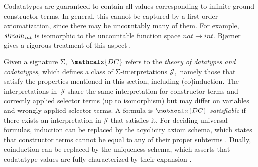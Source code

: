 \documentclass[smallcondensed,draft]{svjour3}
\newcommand\Sig{\mathrm{\Sigma}}
\newcommand\ty[1]{\textit{#1}}
\newcommand{\JJJJ}{\mathcal{\!J\!}}
\newcommand{\thD}{\mathcalx{DC}}
\newcommand\vthinspace{\kern+0.083333em}
\begin{document}
Codatatypes are guaranteed to contain all values corresponding to
infinite ground constructor terms.
In general, this cannot be captured by a
first-order axiomatization, since there may be uncountably many of them.
For example, $\ty{stream}_{\vthinspace\ty{int}}$ is isomorphic to the uncountable
function space $\ty{nat} \to \ty{int}.$ Bj\o rner gives a rigorous treatment of
this aspect \cite{bjoerner-1998}.

Given a signature $\Sig,$ $\thD$ refers to the \emph{theory of
datatypes and codatatypes},
which %
defines a class of $\Sig$-interpretations $\JJJJ,$
namely those that satisfy the %
properties mentioned in this section, including (co)induction. The interpretations
in~$\JJJJ$ share the same interpretation for constructor terms and correctly
applied selector terms (up to isomorphism) %
but may differ on variables and wrongly applied selector terms.
A formula is $\thD$-\emph{satisfiable} if there
exists an interpretation in $\JJJJ$ that satisfies it.
%
For deciding universal formulas, induction can be replaced by the acyclicity
axiom schema, which states that constructor terms cannot be equal to
any of their proper subterms \cite{barrett-et-al-2007}.
Dually, coinduction can be replaced by the uniqueness schema, which
asserts that codatatype values are fully characterized by their %
expansion \cite[Theorem 8.1, 2$\,{\Leftrightarrow}\,$5]{rutten-2000}.



\end{document}
